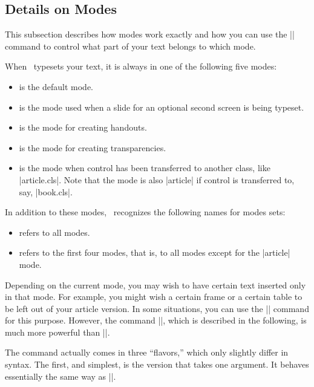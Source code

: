 \subsection{Details on Modes}
\label{section-mode-details}

This subsection describes how modes work exactly and how you can use the |\mode| command to control what part of your text belongs to which mode.

When \beamer\ typesets your text, it is always in one of the following five modes:
\begin{itemize}
\item
   is the default mode.
\item
   is the mode used when a slide for an optional second screen is being typeset.
\item
   is the mode for creating handouts.
\item
   is the mode for creating transparencies.
\item
   is the mode when control has been transferred to another class, like |article.cls|. Note that the mode is also |article| if control is transferred to, say, |book.cls|.
\end{itemize}

In addition to these modes, \beamer\ recognizes the following names for modes sets:

\begin{itemize}
\item
   refers to all modes.
\item
   refers to the first four modes, that is, to all modes except for the |article| mode.
\end{itemize}

Depending on the current mode, you may wish to have certain text inserted only in that mode. For example, you might wish a certain frame or a certain table to be left out of your article version. In some situations, you can use the |\only| command for this purpose. However, the command |\mode|, which is described in the following, is much more powerful than |\only|.

The command actually comes in three ``flavors,'' which only slightly differ in syntax. The first, and simplest, is the version that takes one argument. It behaves essentially the same way as |\only|.

